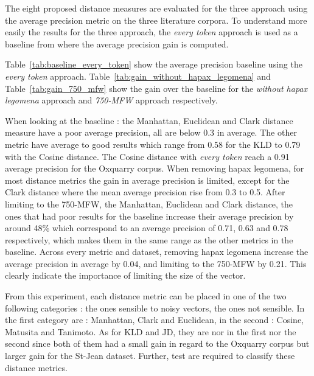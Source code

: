 The eight proposed distance measures are evaluated for the three approach using the average precision metric on the three literature corpora.
To understand more easily the results for the three approach, the \textit{every token} approach is used as a baseline from where the average precision gain is computed.

Table~\ref{tab:baseline_every_token} show the average precision baseline using the \textit{every token} approach.
Table~\ref{tab:gain_without_hapax_legomena} and Table~\ref{tab:gain_750_mfw} show the gain over the baseline for the \textit{without hapax legomena} approach and \textit{750-MFW} approach respectively.

When looking at the baseline : the Manhattan, Euclidean and Clark distance measure have a poor average precision, all are below 0.3 in average.
The other metric have average to good results which range from 0.58 for the KLD to 0.79 with the Cosine distance.
The Cosine distance with \textit{every token} reach a 0.91 average precision for the Oxquarry corpus.
When removing hapax legomena, for most distance metrics the gain in average precision is limited, except for the Clark distance where the mean average precision rise from 0.3 to 0.5.
After limiting to the 750-MFW, the Manhattan, Euclidean and Clark distance, the ones that had poor results for the baseline increase their average precision by around 48\% which correspond to an average precision of 0.71, 0.63 and 0.78 respectively, which makes them in the same range as the other metrics in the baseline.
Across every metric and dataset, removing hapax legomena increase the average precision in average by 0.04, and limiting to the 750-MFW by 0.21.
This clearly indicate the importance of limiting the size of the vector.

From this experiment, each distance metric can be placed in one of the two following categories : the ones sensible to noisy vectors, the ones not sensible.
In the first category are : Manhattan, Clark and Euclidean, in the second : Cosine, Matusita and Tanimoto.
As for KLD and JD, they are nor in the first nor the second since both of them had a small gain in regard to the Oxquarry corpus but larger gain for the St-Jean dataset.
Further, test are required to classify these distance metrics.

